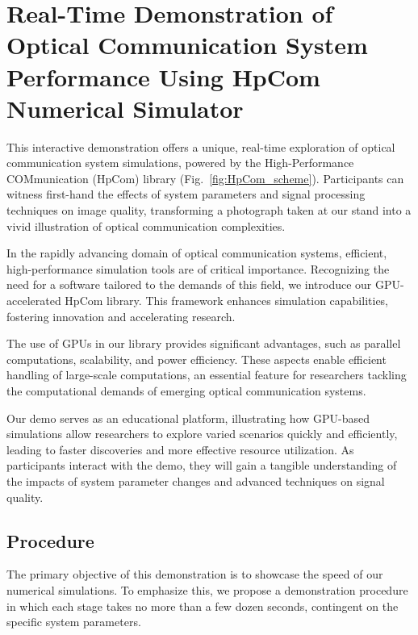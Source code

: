 \chapter{Real-Time Demonstration of Optical Communication System Performance Using HpCom Numerical Simulator}

This interactive demonstration offers a unique, real-time exploration of optical communication system simulations, powered by the High-Performance COMmunication (HpCom) library (Fig.~\ref{fig:HpCom_scheme}). Participants can witness first-hand the effects of system parameters and signal processing techniques on image quality, transforming a photograph taken at our stand into a vivid illustration of optical communication complexities.

In the rapidly advancing domain of optical communication systems, efficient, high-performance simulation tools are of critical importance. Recognizing the need for a software tailored to the demands of this field, we introduce our GPU-accelerated HpCom library\cite{esf0_2023_7880552}. This framework enhances simulation capabilities, fostering innovation and accelerating research.

The use of GPUs in our library provides significant advantages, such as parallel computations, scalability, and power efficiency. These aspects enable efficient handling of large-scale computations, an essential feature for researchers tackling the computational demands of emerging optical communication systems.

Our demo serves as an educational platform, illustrating how GPU-based simulations allow researchers to explore varied scenarios quickly and efficiently, leading to faster discoveries and more effective resource utilization. As participants interact with the demo, they will gain a tangible understanding of the impacts of system parameter changes and advanced techniques on signal quality.



\section{Procedure}

The primary objective of this demonstration is to showcase the speed of our numerical simulations. To emphasize this, we propose a demonstration procedure in which each stage takes no more than a few dozen seconds, contingent on the specific system parameters.


